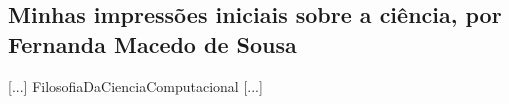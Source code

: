 \subsection{Minhas impressões iniciais sobre a ciência, por Fernanda Macedo de Sousa}

[...] \gls{FilosofiaDaCienciaComputacional} [...]
